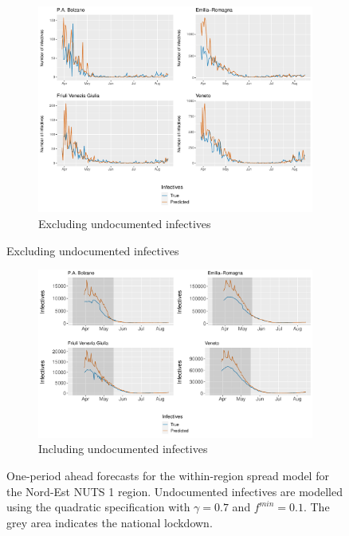 \documentclass[12pt]{article}
\begin{document}
\begin{appendices}
		\begin{figure}[H]
    	    \centering
    	    \begin{subfigure}{\textwidth}
    	      \centering
    	      \includegraphics[width=0.94\linewidth]{output/model_within_lag14_forecast_start20_Nord-Est_rolling.pdf}
    	      \caption{Excluding undocumented infectives}
    	      \label{fig:forecast_within_nordest_regular}
    	    \end{subfigure}
        \end{figure}
        \begin{figure}[H]\ContinuedFloat
    	    \begin{subfigure}{\textwidth}
    	      \centering
    	      \includegraphics[width=0.94\linewidth]{output/model_within_lag14_forecast_start20_Nord-Est_UndocQuadratic_rolling.pdf}
    	      \caption{Including undocumented infectives}
    	      \label{fig:forecast_within_nordest_undoc}
    	    \end{subfigure}
    	    \caption{One-period ahead forecasts for the within-region spread model for the Nord-Est NUTS 1 region. Undocumented infectives are modelled using the quadratic specification with $\gamma = 0.7$ and $f^{min}=0.1$. The grey area indicates the national lockdown.}
    	    \label{fig:forecast_within_nordest}
        \end{figure}
		

\end{appendices}
\end{document}
